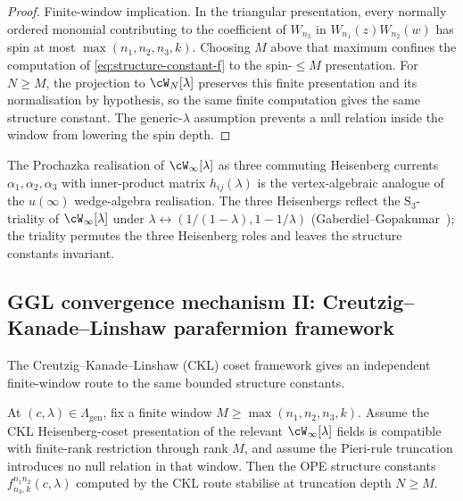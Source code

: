 \begin{proof}
Finite-window implication. In the triangular presentation, every
normally ordered monomial contributing to the coefficient of
\(W_{n_3}\) in \(W_{n_1}(z)W_{n_2}(w)\) has spin at most
\(\max(n_1,n_2,n_3,k)\). Choosing \(M\) above that maximum
confines the computation of \eqref{eq:structure-constant-f} to
the spin-\(\le M\) presentation. For \(N\ge M\), the projection
to \(\cW_N[\lambda]\) preserves this finite presentation and its
normalisation by hypothesis, so the same finite computation
gives the same structure constant. The generic-\(\lambda\)
assumption prevents a null relation inside the window from
lowering the spin depth.
\end{proof}

\begin{remark}
\label{rem:prochazka-three-heisenbergs}
The Prochazka realisation of $\cW_\infty[\lambda]$ as three
commuting Heisenberg currents $\alpha_1, \alpha_2, \alpha_3$ with
inner-product matrix $h_{ij}(\lambda)$ is the vertex-algebraic
analogue of the $u(\infty)$ wedge-algebra realisation. The three
Heisenbergs reflect the $\mathrm{S}_3$-triality of
$\cW_\infty[\lambda]$ under
$\lambda \leftrightarrow (1/(1-\lambda), 1-1/\lambda)$
\textup{(}Gaberdiel--Gopakumar~\cite{GaberdielGopakumar2011-Winfty}\textup{)};
the triality permutes the three Heisenberg roles and leaves the
structure constants invariant.
\end{remark}

\subsection{GGL convergence mechanism II: Creutzig--Kanade--Linshaw
parafermion framework}
\label{subsec:ggl-mechanism-ii-ckl}

The Creutzig--Kanade--Linshaw (CKL) coset framework gives an
independent finite-window route to the same bounded structure
constants.

\begin{theorem}
\label{thm:ggl-convergence-ckl}
At $(c, \lambda) \in \Lambda_{\mathrm{gen}}$, fix a finite window
\(M\ge \max(n_1,n_2,n_3,k)\). Assume the CKL Heisenberg-coset
presentation of the relevant \(\cW_\infty[\lambda]\) fields is
compatible with finite-rank restriction through rank \(M\), and assume
the Pieri-rule truncation introduces no null relation in that window.
Then the OPE structure constants \(f^{n_1 n_2}_{n_3,k}(c,\lambda)\)
computed by the CKL route stabilise at truncation depth
\(N\ge M\).
\end{theorem}

